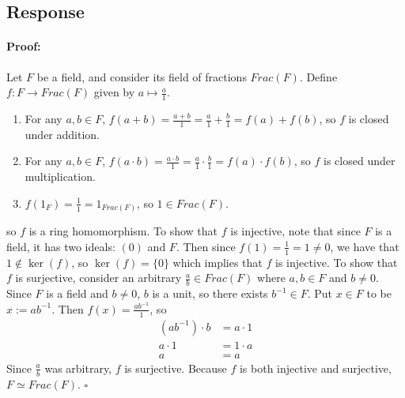 \documentclass [12pt] {article}
\newenvironment{proof}{\paragraph{Proof:}}{\hfill$\square$}
\begin{document}
\subsection*{Response}
\begin{proof}
    Let $F$ be a field, and consider its field of fractions $Frac(F)$. Define $f : F \to Frac(F)$
    given by $a \mapsto \frac{a}{1}$.
    \begin{enumerate}
        \item For any $a, b \in F$,
            $
            f(a + b)
            = \frac{a + b}{1}
            = \frac{a}{1} + \frac{b}{1}
            = f(a) + f(b)
            $,
            so $f$ is closed under addition.
        \item For any
            $a, b \in F$,
            $f(a \cdot b)
            = \frac{a \cdot b}{1}
            = \frac{a}{1} \cdot \frac{b}{1}
            = f(a) \cdot f(b)
            $,
            so $f$ is closed under multiplication.
        \item $f(1_F) = \frac{1}{1} = 1_{Frac(F)}$, so $1 \in Frac(F)$.
    \end{enumerate}
    so $f$ is a ring homomorphism. To show that $f$ is injective, note that since $F$ is a field,
    it has two ideals: $(0)$ and $F$. Then since $f(1) = \frac{1}{1} = 1 \neq 0$, we have that
    $1 \not \in \ker(f)$, so $\ker(f) = \{ 0 \}$ which implies that $f$ is injective. To show that
    $f$ is surjective, consider an arbitrary $\frac{a}{b} \in Frac(F)$ where $a, b \in F$ and
    $b \neq 0$. Since $F$ is a field and $b \neq 0$, $b$ is a unit, so there exists $b^{-1} \in F$.
    Put $x \in F$ to be $x := ab^{-1}$. Then $f(x) = \frac{ab^{-1}}{1}$, so
    \begin{align*}
        (ab^{-1}) \cdot b &= a \cdot 1 \\
        a \cdot 1 &= 1 \cdot a \\
        a &= a
    \end{align*}
    Since $\frac{a}{b}$ was arbitrary, $f$ is surjective. Because $f$ is both injective and
    surjective, $F \simeq Frac(F)$.
\end{proof}
\newpage
\end{document}
